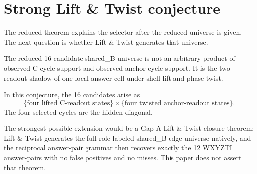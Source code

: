 \section{Strong Lift \& Twist conjecture}

The reduced theorem explains the selector after the reduced universe is given.  The next question is whether Lift \& Twist generates that universe.

\begin{conjecture}
The reduced 16-candidate shared\_B universe is not an arbitrary product of observed C-cycle support and observed anchor-cycle support.  It is the two-readout shadow of one local answer cell under shell lift and phase twist.
\end{conjecture}

In this conjecture, the 16 candidates arise as
\[
    \{\text{four lifted C-readout states}\}
    \times
    \{\text{four twisted anchor-readout states}\}.
\]
The four selected cycles are the hidden diagonal.

The strongest possible extension would be a Gap A Lift \& Twist closure theorem: Lift \& Twist generates the full role-labeled shared\_B edge universe natively, and the reciprocal answer-pair grammar then recovers exactly the 12 WXYZTI answer-pairs with no false positives and no misses.  This paper does not assert that theorem.
